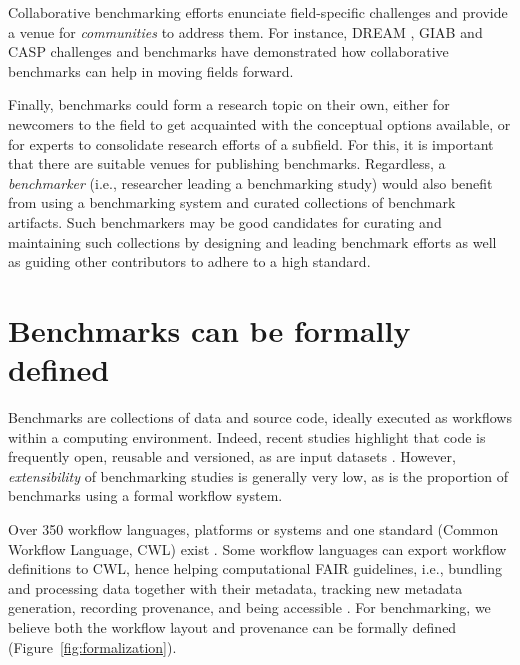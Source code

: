 \documentclass[11pt]{article}
\begin{document}
Collaborative benchmarking efforts enunciate field-specific challenges and provide a venue for \emph{communities} to address them. For instance, DREAM \cite{meyer2021advances}, GIAB \cite{zook2019open} and CASP \cite{moult2005-ne} challenges and benchmarks have demonstrated how collaborative benchmarks can help in moving fields forward.

Finally, benchmarks could form a research topic on their own, either for newcomers to the field to get acquainted with the conceptual options available, or for experts to consolidate research efforts of a subfield. For this, it is important that there are suitable venues for publishing benchmarks. Regardless, a \emph{benchmarker} (i.e., researcher leading a benchmarking study) would also benefit from using a benchmarking system and curated collections of benchmark artifacts. Such benchmarkers may be good candidates for curating and maintaining such collections by designing and leading benchmark efforts as well as guiding other contributors to adhere to a high standard. 

\section*{Benchmarks can be formally defined}

Benchmarks are collections of data and source code, ideally executed as workflows within a computing environment. Indeed, recent studies highlight that code is frequently open, reusable and versioned, as are input datasets \cite{cao2023-jz, Sonrel2023-te}. However, \textit{extensibility} of benchmarking studies is generally very low, as is the proportion of benchmarks using a formal workflow system. 

Over 350 workflow languages, platforms or systems  \cite{Wratten2021-el, Amstutz2024-qk} and one standard (Common Workflow Language, CWL) exist \cite{Amstutz2016-vo}. Some workflow languages can export workflow definitions to CWL, hence helping computational FAIR guidelines, i.e., bundling and processing data together with their metadata, tracking new metadata generation, recording provenance, and being accessible \cite{Goble2020-ps}. For benchmarking, we believe both the workflow layout and provenance can be formally defined (Figure~\ref{fig:formalization}). 
\end{document}
